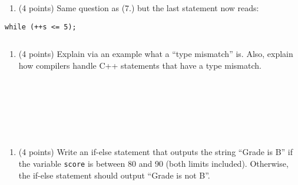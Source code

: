 \begin{enumerate}
\def\labelenumi{\arabic{enumi}.}
\setcounter{enumi}{7}
\tightlist
\item
  (4 points) Same question as (7.) but the last statement now reads:
\end{enumerate}

\begin{verbatim}
while (++s <= 5);
\end{verbatim}

\begin{verbatim}

\end{verbatim}

\begin{enumerate}
\def\labelenumi{\arabic{enumi}.}
\setcounter{enumi}{8}
\tightlist
\item
  (4 points) Explain via an example what a ``type mismatch'' is. Also,
  explain how compilers handle C++ statements that have a type mismatch.
\end{enumerate}

\begin{verbatim}







\end{verbatim}

\begin{enumerate}
\def\labelenumi{\arabic{enumi}.}
\setcounter{enumi}{9}
\tightlist
\item
  (4 points) Write an if-else statement that outputs the string ``Grade
  is B'' if the variable \texttt{score} is between 80 and 90 (both
  limits included). Otherwise, the if-else statement should output
  ``Grade is not B''.
\end{enumerate}

\begin{verbatim}


\end{verbatim}
